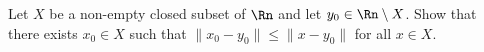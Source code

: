 Let $X$ be a non-empty closed subset of $\Rn$ and let $y_0\in
\Rn\setminus X$. Show that there exists $x_0\in X$ such that
$\|x_0-y_0\|\leq \|x-y_0\|$ for all $x\in X$.
